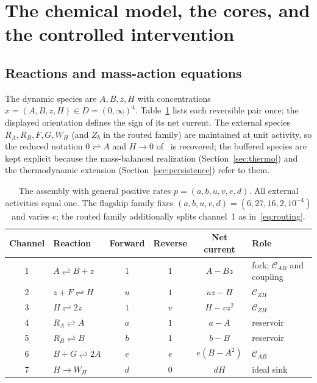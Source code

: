 \documentclass[11pt,a4paper]{article}
\theoremstyle{plain}
\theoremstyle{definition}
\theoremstyle{remark}
\newcommand{\cAB}{\mathcal{C}_{AB}}
\newcommand{\cZH}{\mathcal{C}_{ZH}}
\begin{document}
\section{The chemical model, the cores, and the controlled intervention}\label{sec:model}

\subsection{Reactions and mass-action equations}

The dynamic species are $A,B,z,H$ with concentrations $x=(A,B,z,H)\in D=(0,\infty)^4$. Table~\ref{tab:reactions} lists each reversible pair once; the displayed orientation defines the sign of its net current. The external species $R_A,R_B,F,G,W_H$ (and $Z_b$ in the routed family) are maintained at unit activity, so the reduced notation $0\rightleftharpoons A$ and $H\to0$ of~\cite{nandan2026} is recovered; the buffered species are kept explicit because the mass-balanced realization (Section~\ref{sec:thermo}) and the thermodynamic extension (Section~\ref{sec:persistence}) refer to them.

\begin{table}[tb]\centering\small
\begin{tabular}{@{}clcccl@{}}\toprule
Channel & Reaction & Forward & Reverse & Net current & Role\\\midrule
1 & $A\rightleftharpoons B+z$ & $1$ & $1$ & $A-Bz$ & fork; $\cAB$ and coupling\\
2 & $z+F\rightleftharpoons H$ & $u$ & $1$ & $uz-H$ & $\cZH$\\
3 & $H\rightleftharpoons 2z$ & $1$ & $v$ & $H-vz^2$ & $\cZH$\\
4 & $R_A\rightleftharpoons A$ & $a$ & $1$ & $a-A$ & reservoir\\
5 & $R_B\rightleftharpoons B$ & $b$ & $1$ & $b-B$ & reservoir\\
6 & $B+G\rightleftharpoons 2A$ & $e$ & $e$ & $e(B-A^2)$ & $\cAB$\\
7 & $H\longrightarrow W_H$ & $d$ & $0$ & $dH$ & ideal sink\\\bottomrule
\end{tabular}
\caption{The assembly with general positive rates $p=(a,b,u,v,e,d)$. All external activities equal one. The flagship family fixes $(a,b,u,v,d)=(6,27,16,2,10^{-4})$ and varies $e$; the routed family additionally splits channel~1 as in~\eqref{eq:routing}.}\label{tab:reactions}
\end{table}
\end{document}
